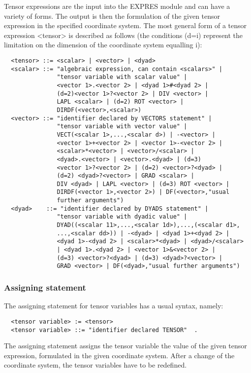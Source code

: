      Tensor expressions  are the  input into  the EXPRES  module and can
have a variety of forms. The output is then the formulation of the given
tensor expression  in the  specified coordinate system. The most general
form of a  tensor  expression  <tensor>  is  described  as  follows (the
conditions  (d=i)  represent  the  limitation  on  the  dimension of the
coordinate system equalling i):
\begin{verbatim}
  <tensor> ::= <scalar> | <vector> | <dyad>
  <scalar> ::= "algebraic expression, can contain <scalars>" |
               "tensor variable with scalar value" |
               <vector 1>.<vector 2> | <dyad 1>#<dyad 2> |
               (d=2)<vector 1>?<vector 2> | DIV <vector> |
               LAPL <scalar> | (d=2) ROT <vector> |
               DIRDF(<vector>,<scalar>)
  <vector> ::= "identifier declared by VECTORS statement" |
               "tensor variable with vector value" |
               VECT(<scalar 1>,...,<scalar d>) | -<vector> |
               <vector 1>+<vector 2> | <vector 1>-<vector 2> |
               <scalar>*<vector> | <vector>/<scalar> |
               <dyad>.<vector> | <vector>.<dyad> | (d=3)
               <vector 1>?<vector 2> | (d=2) <vector>?<dyad> |
               (d=2) <dyad>?<vector> | GRAD <scalar> |
               DIV <dyad> | LAPL <vector> | (d=3) ROT <vector> |
               DIRDF(<vector 1>,<vector 2>) | DF(<vector>,"usual
               further arguments")
  <dyad>    ::= "identifier declared by DYADS statement" |
               "tensor variable with dyadic value" |
               DYAD((<scalar 11>,...,<scalar 1d>),...,(<scalar d1>,
               ...,<scalar dd>)) | -<dyad> | <dyad 1>+<dyad 2> |
               <dyad 1>-<dyad 2> | <scalar>*<dyad> | <dyad>/<scalar>
               | <dyad 1>.<dyad 2> | <vector 1>&<vector 2> |
               (d=3) <vector>?<dyad> | (d=3) <dyad>?<vector> |
               GRAD <vector> | DF(<dyad>,"usual further arguments")
\end{verbatim}

\subsubsection{Assigning statement}


     The assigning statement for  tensor variables  has a  usual syntax,
namely:
\begin{verbatim}
  <tensor variable> := <tensor>
  <tensor variable> ::= "identifier declared TENSOR"  .
\end{verbatim}
The assigning  statement assigns  the tensor  variable the  value of the
given tensor expression,  formulated  in  the  given  coordinate system.
After a change of the coordinate system, the tensor variables have to be
redefined.



